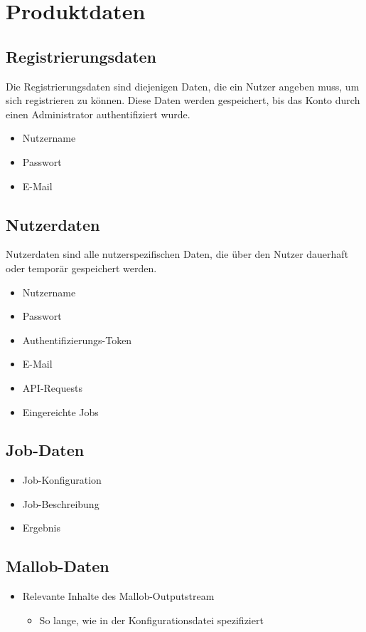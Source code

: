 \section{Produktdaten}


\label{PD:Registrierungsdaten}
\subsection{Registrierungsdaten}
Die Registrierungsdaten sind diejenigen Daten, die ein Nutzer angeben muss, um sich registrieren zu können. Diese Daten werden gespeichert, bis das Konto durch einen Administrator authentifiziert wurde.
\begin{itemize}
    \item Nutzername
    \item Passwort
    \item E-Mail
\end{itemize}

\label{PD:Nutzerdaten}
\subsection{Nutzerdaten}
Nutzerdaten sind alle nutzerspezifischen Daten, die über den Nutzer dauerhaft oder temporär gespeichert werden.
\begin{itemize}
    \item Nutzername
    \item Passwort
    \item Authentifizierungs-Token
    \item E-Mail
    \item API-Requests
    \item Eingereichte Jobs
\end{itemize}



\subsection{Job-Daten}
\begin{itemize}
    \item Job-Konfiguration
    \item Job-Beschreibung
    \item Ergebnis
\end{itemize}

\subsection{Mallob-Daten}
\begin{itemize}
    \item Relevante Inhalte des Mallob-Outputstream 
    \begin{itemize}
        \item So lange, wie in der Konfigurationsdatei spezifiziert
    \end{itemize}
    
\end{itemize}
